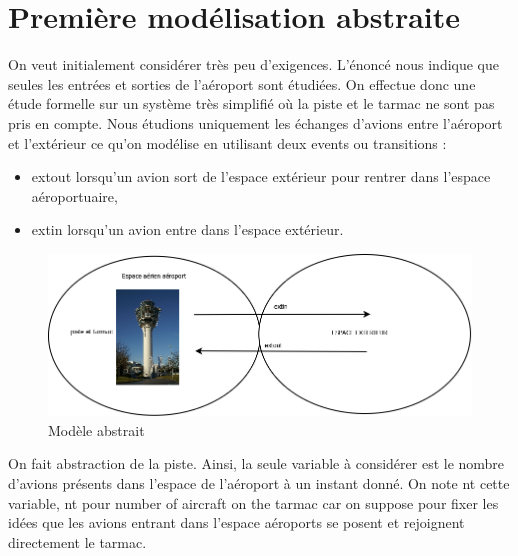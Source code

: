 \section{Première modélisation abstraite}
	

   On veut initialement considérer très peu d'exigences. L'énoncé nous indique
   que seules les entrées et sorties de l'aéroport sont étudiées. On effectue donc une étude formelle sur un système très simplifié où la piste et le tarmac ne sont pas pris en compte. Nous étudions uniquement les échanges d'avions entre l'aéroport et l'extérieur ce qu'on modélise en utilisant deux events ou transitions :
   
   \begin{itemize}
   	\item extout lorsqu'un avion sort de l'espace extérieur pour rentrer dans l'espace aéroportuaire,
   	\item extin lorsqu'un avion entre dans l'espace extérieur.
   \end{itemize} 

\begin{figure}[H]
	\begin{center}	
		\includegraphics[scale=0.4]{images/mod0}
		\caption{Modèle abstrait}
		\label{mod0}
	\end{center}
\end{figure}

On fait abstraction de la piste. Ainsi, la seule variable à considérer est le nombre d'avions présents dans l'espace de l'aéroport à un instant donné. On note nt cette variable, nt pour number of aircraft on the tarmac car on suppose pour fixer les idées que les avions entrant dans l'espace aéroports se posent et rejoignent directement le tarmac.

